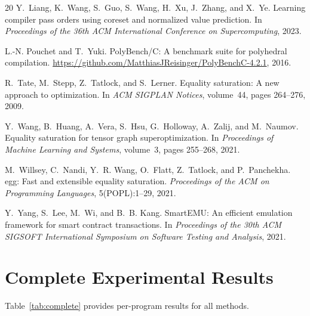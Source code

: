 \documentclass{article}
\begin{document}
\begin{thebibliography}{20}
Y.~Liang, K.~Wang, S.~Guo, S.~Wang, H.~Xu, J.~Zhang, and X.~Ye.
\newblock Learning compiler pass orders using coreset and normalized value prediction.
\newblock In \emph{Proceedings of the 36th ACM International Conference on Supercomputing}, 2023.

L.-N. Pouchet and T.~Yuki.
\newblock PolyBench/C: A benchmark suite for polyhedral compilation.
\newblock \url{https://github.com/MatthiasJReisinger/PolyBenchC-4.2.1}, 2016.

R.~Tate, M.~Stepp, Z.~Tatlock, and S.~Lerner.
\newblock Equality saturation: A new approach to optimization.
\newblock In \emph{ACM SIGPLAN Notices}, volume~44, pages 264--276, 2009.

Y.~Wang, B.~Huang, A.~Vera, S.~Hsu, G.~Holloway, A.~Zalij, and M.~Naumov.
\newblock Equality saturation for tensor graph superoptimization.
\newblock In \emph{Proceedings of Machine Learning and Systems}, volume~3, pages 255--268, 2021.

M.~Willsey, C.~Nandi, Y.~R. Wang, O.~Flatt, Z.~Tatlock, and P.~Panchekha.
\newblock egg: Fast and extensible equality saturation.
\newblock \emph{Proceedings of the ACM on Programming Languages}, 5(POPL):1--29, 2021.

Y.~Yang, S.~Lee, M.~Wi, and B.~B. Kang.
\newblock SmartEMU: An efficient emulation framework for smart contract transactions.
\newblock In \emph{Proceedings of the 30th ACM SIGSOFT International Symposium on Software Testing and Analysis}, 2021.

\end{thebibliography}

\newpage
\appendix

\section{Complete Experimental Results}

Table~\ref{tab:complete} provides per-program results for all methods.
\end{document}
